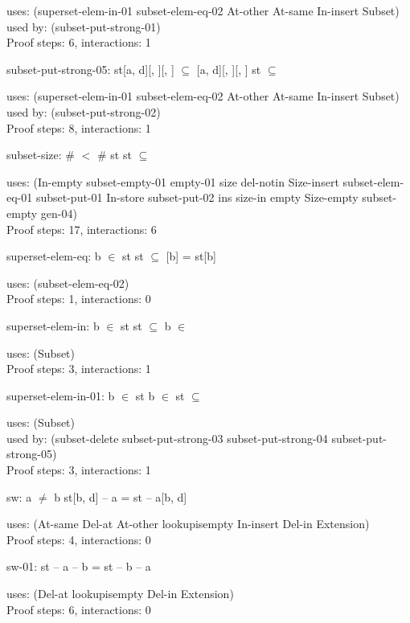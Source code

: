 \documentclass[a4paper]{article}
\begin{document}
uses: (superset-elem-in-01 subset-elem-eq-02 At-other At-same In-insert
       Subset)\\
used by: (subset-put-strong-01)\\
Proof steps: 6, interactions: 1

\medskip

subset-put-strong-05: 
 \Fol \Not st[a, d][, ][, ] $\subseteq$ [a, d][, ][, ] \Imp \Not st $\subseteq$ 


uses: (superset-elem-in-01 subset-elem-eq-02 At-other At-same In-insert
       Subset)\\
used by: (subset-put-strong-02)\\
Proof steps: 8, interactions: 1

\medskip

subset-size: 
 \Fol \#  $<$ \# st \Imp \Not st $\subseteq$ 


uses: (In-empty subset-empty-01 empty-01 size del-notin Size-insert
       subset-elem-eq-01 subset-put-01 In-store subset-put-02 ins
       size-in empty Size-empty subset-empty gen-04)\\
Proof steps: 17, interactions: 6

\medskip

superset-elem-eq: 
 \Fol b $\in$ st \And st $\subseteq$  \Imp {}[b] = st[b]


uses: (subset-elem-eq-02)\\
Proof steps: 1, interactions: 0

\medskip

superset-elem-in: 
 \Fol b $\in$ st \And st $\subseteq$  \Imp b $\in$ 


uses: (Subset)\\
Proof steps: 3, interactions: 1

\medskip

superset-elem-in-01: 
 \Fol b $\in$ st \And \Not b $\in$  \Imp \Not st $\subseteq$ 


uses: (Subset)\\
used by: (subset-delete subset-put-strong-03 subset-put-strong-04
          subset-put-strong-05)\\
Proof steps: 3, interactions: 1

\medskip

sw: 
 \Fol a $\neq$ b \Imp st[b, d] -- a = st -- a[b, d]


uses: (At-same Del-at At-other lookupisempty In-insert Del-in
       Extension)\\
Proof steps: 4, interactions: 0

\medskip

sw-01: 
 \Fol st -- a -- b = st -- b -- a


uses: (Del-at lookupisempty Del-in Extension)\\
Proof steps: 6, interactions: 0

\medskip
\end{document}
